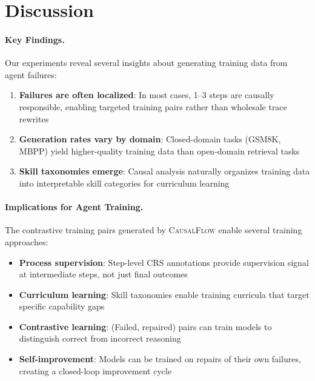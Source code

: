 \documentclass{article}
\theoremstyle{plain}
\theoremstyle{definition}
\theoremstyle{remark}
\begin{document}
\section{Discussion}

\paragraph{Key Findings.}
Our experiments reveal several insights about generating training data from agent failures:
\begin{enumerate}
    \item \textbf{Failures are often localized}: In most cases, 1--3 steps are causally responsible, enabling targeted training pairs rather than wholesale trace rewrites
    \item \textbf{Generation rates vary by domain}: Closed-domain tasks (GSM8K, MBPP) yield higher-quality training data than open-domain retrieval tasks
    \item \textbf{Skill taxonomies emerge}: Causal analysis naturally organizes training data into interpretable skill categories for curriculum learning
\end{enumerate}

\paragraph{Implications for Agent Training.}
The contrastive training pairs generated by \textsc{CausalFlow} enable several training approaches:
\begin{itemize}
    \item \textbf{Process supervision}: Step-level CRS annotations provide supervision signal at intermediate steps, not just final outcomes
    \item \textbf{Curriculum learning}: Skill taxonomies enable training curricula that target specific capability gaps
    \item \textbf{Contrastive learning}: (Failed, repaired) pairs can train models to distinguish correct from incorrect reasoning
    \item \textbf{Self-improvement}: Models can be trained on repairs of their own failures, creating a closed-loop improvement cycle
\end{itemize}
\end{document}
